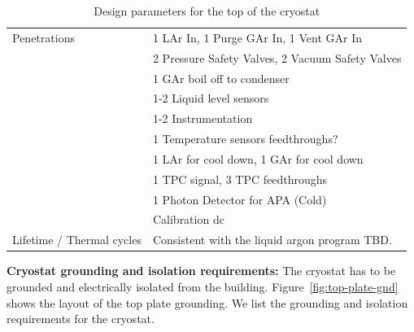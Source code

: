 \begin{table}[htpb]
\begin{tabular}{|p{}|p{}|}
Penetrations  &  1 LAr In, 1 Purge GAr In, 1 Vent GAr In \\ 
& 2 Pressure Safety Valves, 2 Vacuum Safety Valves \\ 
& 1 GAr boil off to condenser \\ 
& 1-2 Liquid level sensors \\ 
& 1-2 Instrumentation \\ 
& 1 Temperature sensors feedthroughs? \\ 
& 1 LAr for cool down, 1 GAr for cool down \\ 
& 1 TPC signal, 3 TPC feedthroughs \\
& 1 Photon Detector for APA (Cold) \\
& Calibration dc\\ \hline
Lifetime / Thermal cycles  & Consistent with the liquid argon program TBD. \\ \hline
\end{tabular}
\caption{Design parameters for the top of the cryostat}
\label{tbl:cryostat-top-parameters}
\end{table}

\textbf{Cryostat grounding and isolation requirements:}
%
The cryostat has to be grounded and electrically isolated from the building. 
Figure~\ref{fig:top-plate-gnd} shows the layout of the top plate grounding.
We list the grounding and isolation requirements for the cryostat. 

